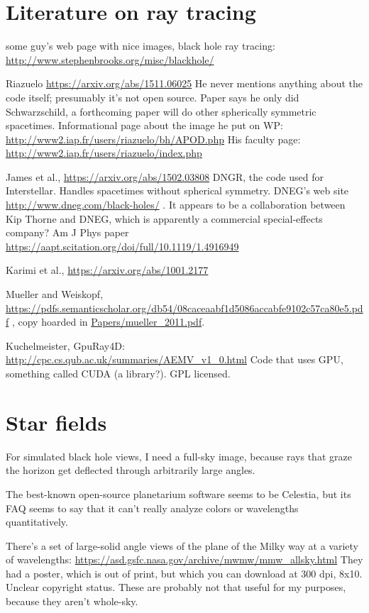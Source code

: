 \documentclass{article}
\begin{document}
\section{Literature on ray tracing}

some guy's web page with nice images, black hole ray tracing:
\url{http://www.stephenbrooks.org/misc/blackhole/}

Riazuelo
\url{https://arxiv.org/abs/1511.06025} He never mentions anything about the code itself; presumably
it's not open source. Paper says he only did Schwarzschild, a forthcoming paper will
do other spherically symmetric spacetimes.
Informational page about the image he put on WP: \url{http://www2.iap.fr/users/riazuelo/bh/APOD.php}
His faculty page: \url{http://www2.iap.fr/users/riazuelo/index.php}

James et al., \url{https://arxiv.org/abs/1502.03808} DNGR, the code used for Interstellar.
Handles spacetimes without spherical symmetry. DNEG's web site
\url{http://www.dneg.com/black-holes/} . It appears to be a collaboration between Kip Thorne and
DNEG, which is apparently a commercial special-effects company?
Am J Phys paper \url{https://aapt.scitation.org/doi/full/10.1119/1.4916949}

Karimi et al., \url{https://arxiv.org/abs/1001.2177}

Mueller and Weiskopf, \url{https://pdfs.semanticscholar.org/db54/08caceaabf1d5086accabfe9102c57ca80e5.pdf} ,
copy hoarded in \url{Papers/mueller_2011.pdf}.

Kuchelmeister, GpuRay4D: \url{http://cpc.cs.qub.ac.uk/summaries/AEMV_v1_0.html}
Code that uses GPU, something called CUDA (a library?). GPL licensed.

\section{Star fields}

For simulated black hole views, I need a full-sky image, because rays that graze the horizon
get deflected through arbitrarily large angles.

The best-known open-source planetarium software seems to be Celestia, but its FAQ
seems to say that it can't really analyze colors or wavelengths quantitatively.

There's a set of large-solid angle views of the plane of the Milky way at a variety
of wavelengths: \url{https://asd.gsfc.nasa.gov/archive/mwmw/mmw_allsky.html} They had
a poster, which is out of print, but which you can download at 300 dpi, 8x10. Unclear
copyright status. These are probably not that useful for my purposes, because they
aren't whole-sky.
\end{document}
